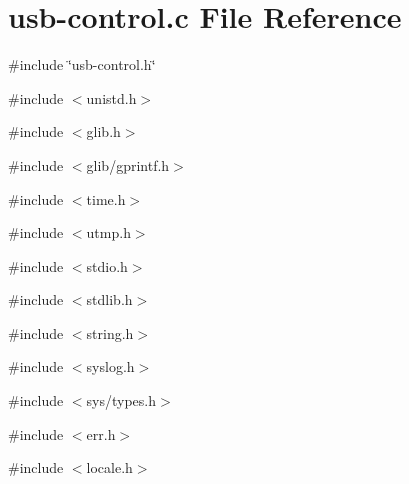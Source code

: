 \hypertarget{usb-control_8c}{
\section{usb-\/control.c File Reference}
\label{usb-control_8c}
}
{\ttfamily \#include \char`\"{}usb-\/control.h\char`\"{}}\par
{\ttfamily \#include $<$unistd.h$>$}\par
{\ttfamily \#include $<$glib.h$>$}\par
{\ttfamily \#include $<$glib/gprintf.h$>$}\par
{\ttfamily \#include $<$time.h$>$}\par
{\ttfamily \#include $<$utmp.h$>$}\par
{\ttfamily \#include $<$stdio.h$>$}\par
{\ttfamily \#include $<$stdlib.h$>$}\par
{\ttfamily \#include $<$string.h$>$}\par
{\ttfamily \#include $<$syslog.h$>$}\par
{\ttfamily \#include $<$sys/types.h$>$}\par
{\ttfamily \#include $<$err.h$>$}\par
{\ttfamily \#include $<$locale.h$>$}\par
